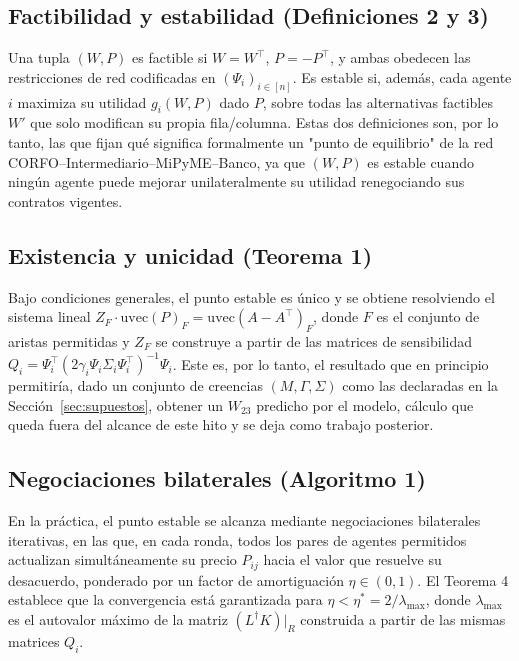 \documentclass[11pt]{article}
\begin{document}
\subsection{Factibilidad y estabilidad (Definiciones 2 y 3)}

Una tupla $(W,P)$ es factible si $W=W^\top$, $P=-P^\top$, y ambas obedecen las restricciones de red codificadas en $(\Psi_i)_{i\in[n]}$. Es estable si, además, cada agente $i$ maximiza su utilidad $g_i(W,P)$ dado $P$, sobre todas las alternativas factibles $W'$ que solo modifican su propia fila/columna. Estas dos definiciones son, por lo tanto, las que fijan qué significa formalmente un "punto de equilibrio" de la red CORFO--Intermediario--MiPyME--Banco, ya que $(W,P)$ es estable cuando ningún agente puede mejorar unilateralmente su utilidad renegociando sus contratos vigentes.

\subsection{Existencia y unicidad (Teorema 1)}

Bajo condiciones generales, el punto estable es único y se obtiene resolviendo el sistema lineal $Z_F \cdot \mathrm{uvec}(P)_F = \mathrm{uvec}(A-A^\top)_F$, donde $F$ es el conjunto de aristas permitidas y $Z_F$ se construye a partir de las matrices de sensibilidad $Q_i = \Psi_i^\top(2\gamma_i \Psi_i \Sigma_i \Psi_i^\top)^{-1}\Psi_i$. Este es, por lo tanto, el resultado que en principio permitiría, dado un conjunto de creencias $(M,\Gamma,\Sigma)$ como las declaradas en la Sección~\ref{sec:supuestos}, obtener un $W_{23}$ predicho por el modelo, cálculo que queda fuera del alcance de este hito y se deja como trabajo posterior.

\subsection{Negociaciones bilaterales (Algoritmo 1)}

En la práctica, el punto estable se alcanza mediante negociaciones bilaterales iterativas, en las que, en cada ronda, todos los pares de agentes permitidos actualizan simultáneamente su precio $P_{ij}$ hacia el valor que resuelve su desacuerdo, ponderado por un factor de amortiguación $\eta \in (0,1)$. El Teorema 4 establece que la convergencia está garantizada para $\eta < \eta^* = 2/\lambda_{\max}$, donde $\lambda_{\max}$ es el autovalor máximo de la matriz $(L^\dagger K)|_R$ construida a partir de las mismas matrices $Q_i$.
\end{document}
